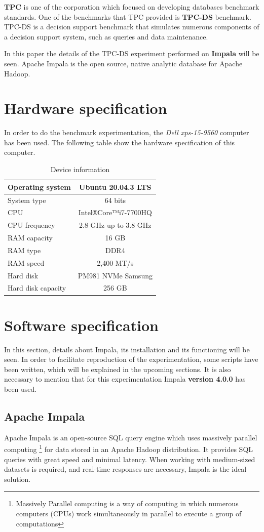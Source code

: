 \documentclass{article}
\newcommand\bld[1]{\textbf{#1}}
\newcommand\ita[1]{\textit{#1}}
\begin{document}
\bld{TPC} is one of the corporation which focused on developing databases benchmark standards. One of the benchmarks that TPC provided is \bld{TPC-DS} benchmark. TPC-DS is a decision support benchmark that simulates numerous components of a decision support system, such as queries and data maintenance.

In this paper the details of the TPC-DS experiment performed on \bld{Impala} will be seen. Apache Impala is the open source, native analytic database for Apache Hadoop.

\section{Hardware specification}
In order to do the benchmark experimentation, the \ita{Dell xps-15-9560} computer has been used. The following table show the hardware specification of this computer.

\begin{table}[h]
\centering
\begin{tabular}{|l|c|}
\hline
Operating system & Ubuntu 20.04.3 LTS \\ \hline
System type & 64 bits \\ \hline
CPU & Intel®Core™i7-7700HQ \\ \hline
CPU frequency & 2.8 GHz up to 3.8 GHz \\ \hline
RAM capacity & 16 GB \\ \hline
RAM type & DDR4 \\ \hline
RAM speed & 2,400 MT/s \\ \hline
Hard disk & PM981 NVMe Samsung \\ \hline
Hard disk capacity & 256 GB \\ \hline
\end{tabular}
\caption{Device information}
\label{table:Table 1}
\end{table}


\section{Software specification}
In this section, details about Impala, its installation and its functioning will be seen. In order to facilitate reproduction of the experimentation, some scripts have been written, which will be explained in the upcoming sections. It is also necessary to mention that for this experimentation Impala \bld{version 4.0.0} has been used.  

\subsection{Apache Impala}
Apache Impala is an open-source SQL query engine which uses massively parallel computing \footnote{Massively Parallel computing is a way of computing in which numerous computers (CPUs) work simultaneously in parallel to execute a group of computations} for data stored in an Apache Hadoop distribution. It provides SQL queries with great speed and minimal latency. When working with medium-sized datasets is required, and real-time responses are necessary, Impala is the ideal solution.
\end{document}
